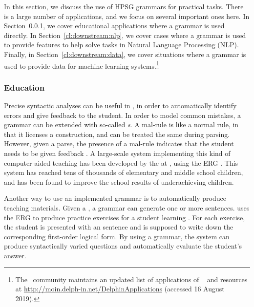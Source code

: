 \documentclass[output=paper
                ,modfonts
                ,nonflat
	        ,collection
	        ,collectionchapter
	        ,collectiontoclongg
 	        ,biblatex
                ,babelshorthands
                ,newtxmath
                ,draftmode
                ,colorlinks, citecolor=brown
]{./langsci/langscibook}
\begin{document}

In this section, we discuss
the use of HPSG grammars for practical tasks.
There is a large number of applications,
and we focus on several important ones here.
In Section~\ref{cl:downstream:edu},
we cover educational applications where a grammar is used directly.
In Section~\ref{cl:downstream:nlp},
we cover cases where a grammar is used to provide features
to help solve tasks in Natural Language Processing (NLP).
Finally, in Section~\ref{cl:downstream:data},
we cover situations where a grammar is used to provide data for machine learning systems.\footnote{The \delphin\ community maintains an updated list
of applications of \delphin\  and resources at \url{http://moin.delph-in.net/DelphinApplications} (accessed 16 August 2019).}



\subsubsection{Education}
\label{cl:downstream:edu}


Precise syntactic analyses can be useful in ,
in order to automatically identify errors and give feedback to the student.
In order to model common mistakes,
a grammar can be extended with so-called \textit{s}.
A mal-rule is like a normal rule, in that it licenses a construction,
and can be treated the same during parsing. However, given a parse,
the presence of a mal-rule indicates that the student needs to be given feedback
\citep{Ben:Fli:Oep:04,flickinger2013error,morgadodacosta2016error}.
A large-scale system implementing this kind of computer-aided teaching has been developed
by the  at ,
using the ERG \citep{suppes2014teach}.
This system has reached tens of thousands of elementary and middle school children,
and has been found to improve the school results of underachieving children.

Another way to use an implemented grammar is to automatically produce teaching materials.
Given a ,
a grammar can generate one or more sentences.
\citet{Flickinger:17} uses the ERG to produce practice exercises for a student learning .
For each exercise, the student is presented with an  sentence
and is supposed to write down the corresponding first-order logical form.
By using a grammar, the system can produce syntactically varied questions
and automatically evaluate the student's answer.%
\end{document}
